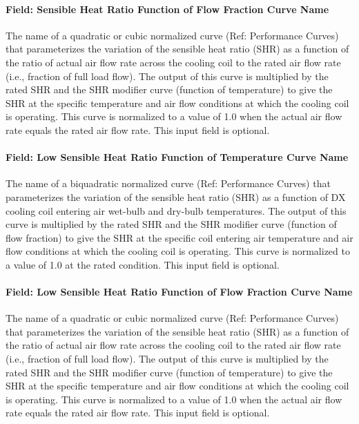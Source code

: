 \paragraph{Field: Sensible Heat Ratio Function of Flow Fraction Curve Name}\label{field-sensible-heat-ratio-function-of-flow-fraction-curve-name-1}

The name of a quadratic or cubic normalized curve (Ref: Performance Curves) that parameterizes the variation of the sensible heat ratio (SHR) as a function of the ratio of actual air flow rate across the cooling coil to the rated air flow rate (i.e., fraction of full load flow). The output of this curve is multiplied by the rated SHR and the SHR modifier curve (function of temperature) to give the SHR at the specific temperature and air flow conditions at which the cooling coil is operating. This curve is normalized to a value of 1.0 when the actual air flow rate equals the rated air flow rate. This input field is optional.

\paragraph{Field: Low Sensible Heat Ratio Function of Temperature Curve Name}\label{field-low-sensible-heat-ratio-function-of-temperature-curve-name}

The name of a biquadratic normalized curve (Ref: Performance Curves) that parameterizes the variation of the sensible heat ratio (SHR) as a function of DX cooling coil entering air wet-bulb and dry-bulb temperatures. The output of this curve is multiplied by the rated SHR and the SHR modifier curve (function of flow fraction) to give the SHR at the specific coil entering air temperature and air flow conditions at which the cooling coil is operating. This curve is normalized to a value of 1.0 at the rated condition. This input field is optional.

\paragraph{Field: Low Sensible Heat Ratio Function of Flow Fraction Curve Name}\label{field-low-sensible-heat-ratio-function-of-flow-fraction-curve-name}

The name of a quadratic or cubic normalized curve (Ref: Performance Curves) that parameterizes the variation of the sensible heat ratio (SHR) as a function of the ratio of actual air flow rate across the cooling coil to the rated air flow rate (i.e., fraction of full load flow). The output of this curve is multiplied by the rated SHR and the SHR modifier curve (function of temperature) to give the SHR at the specific temperature and air flow conditions at which the cooling coil is operating. This curve is normalized to a value of 1.0 when the actual air flow rate equals the rated air flow rate. This input field is optional.

